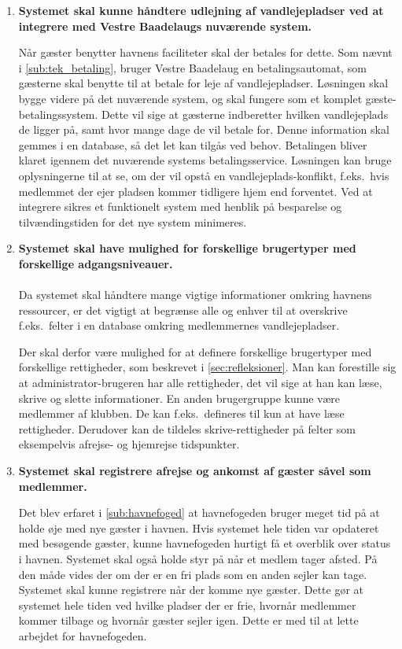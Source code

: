 
\begin{enumerate}
	\item \label{itm:udlejning} \textbf{ Systemet skal kunne håndtere udlejning af vandlejepladser ved at integrere med Vestre Baadelaugs nuværende system. }

Når gæster benytter havnens faciliteter skal der betales for dette. Som nævnt i \cref{sub:tek_betaling}, bruger Vestre Baadelaug en betalingsautomat, som gæsterne skal benytte til at betale for leje af vandlejepladser. Løsningen skal bygge videre på det nuværende system, og skal fungere som et komplet gæste-betalingssystem. Dette vil sige at gæsterne indberetter hvilken vandlejeplads de ligger på, samt hvor mange dage de vil betale for. Denne information skal gemmes i en database, så det let kan tilgås ved behov. Betalingen bliver klaret igennem det nuværende systems betalingsservice. Løsningen kan bruge oplysningerne til at se, om der vil opstå en vandlejeplads-konflikt, f.eks.\ hvis medlemmet der ejer pladsen kommer tidligere hjem end forventet. Ved at integrere sikres et funktionelt system med henblik på besparelse og tilvændingstiden for det nye system minimeres.

	\item \label{itm:brugergrupper} \textbf{ Systemet skal have mulighed for forskellige brugertyper med forskellige adgangsniveauer.} \\\\
  Da systemet skal håndtere mange vigtige informationer omkring havnens ressourcer, er det vigtigt at begrænse alle og enhver til at overskrive f.eks.\ felter i en database omkring medlemmernes vandlejepladser.

  Der skal derfor være mulighed for at definere forskellige brugertyper med forskellige rettigheder, som beskrevet i \cref{sec:refleksioner}. Man kan forestille sig at administrator-brugeren har alle rettigheder, det vil sige at han kan læse, skrive og slette informationer. En anden brugergruppe kunne være medlemmer af klubben. De kan f.eks.\ defineres til kun at have læse rettigheder. Derudover kan de tildeles skrive-rettigheder på felter som eksempelvis afrejse- og hjemrejse tidspunkter.

\item \label{itm:reg_an_afkomst} \textbf{Systemet skal registrere afrejse og ankomst af gæster såvel som medlemmer.} 

  Det blev erfaret i \cref{sub:havnefoged} at havnefogeden bruger meget tid på at holde øje med nye gæster i havnen. Hvis systemet hele tiden var opdateret med besøgende gæster, kunne havnefogeden hurtigt få et overblik over status i havnen. Systemet skal også holde styr på når et medlem tager afsted. På den måde vides der om der er en fri plads som en anden sejler kan tage. Systemet skal kunne registrere når der komme nye gæster. Dette gør at systemet hele tiden ved hvilke pladser der er frie, hvornår medlemmer kommer tilbage og hvornår gæster sejler igen. Dette er med til at lette arbejdet for havnefogeden.


\end{enumerate}
